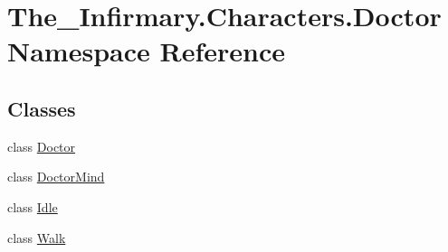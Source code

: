 \hypertarget{namespace_the___infirmary_1_1_characters_1_1_doctor}{}\section{The\+\_\+\+Infirmary.\+Characters.\+Doctor Namespace Reference}
\label{namespace_the___infirmary_1_1_characters_1_1_doctor}
\subsection*{Classes}
\begin{DoxyCompactItemize}
\item 
class \mbox{\hyperlink{class_the___infirmary_1_1_characters_1_1_doctor_1_1_doctor}{Doctor}}
\item 
class \mbox{\hyperlink{class_the___infirmary_1_1_characters_1_1_doctor_1_1_doctor_mind}{Doctor\+Mind}}
\item 
class \mbox{\hyperlink{class_the___infirmary_1_1_characters_1_1_doctor_1_1_idle}{Idle}}
\item 
class \mbox{\hyperlink{class_the___infirmary_1_1_characters_1_1_doctor_1_1_walk}{Walk}}
\end{DoxyCompactItemize}
